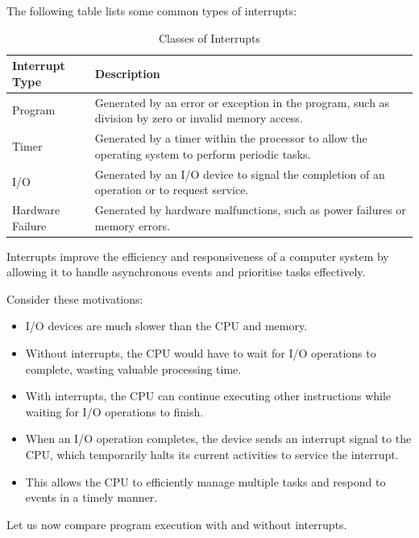\documentclass{article}
\begin{document}
The following table lists some common types of interrupts:
\begin{table}[h!]
\centering
\begin{tabular}{|l|p{10cm}|}  %
\hline
\textbf{Interrupt Type} & \textbf{Description} \\
\hline
Program & Generated by an error or exception in the program, such as division by zero or invalid memory access. \\
\hline
Timer & Generated by a timer within the processor to allow the operating system to perform periodic tasks. \\
\hline
I/O & Generated by an I/O device to signal the completion of an operation or to request service. \\
\hline
Hardware Failure & Generated by hardware malfunctions, such as power failures or memory errors. \\
\hline
\end{tabular}
\caption{Classes of Interrupts}
\label{tab:interrupts}
\end{table}

Interrupts improve the efficiency and responsiveness of a computer system by allowing it to handle 
asynchronous events and prioritise tasks effectively.

Consider these motivations:
\begin{itemize}
    \item I/O devices are much slower than the CPU and memory.
    \item Without interrupts, the CPU would have to wait for I/O operations to complete, wasting valuable processing time.
    \item With interrupts, the CPU can continue executing other instructions while waiting for I/O operations to finish.
    \item When an I/O operation completes, the device sends an interrupt signal to the CPU, 
    which temporarily halts its current activities to service the interrupt.
    \item This allows the CPU to efficiently manage multiple tasks and respond to events in a timely manner.
\end{itemize}

\newpage

Let us now compare program execution with and without interrupts.
\end{document}
